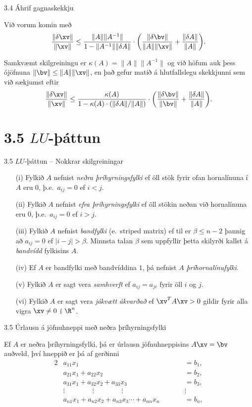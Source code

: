 \begin{frame}{3.4 Áhrif gagnaskekkju} 

Við vorum komin með 
$$
\dfrac{\|\delta\xv\|} {\|\xv\|}\leq 
\dfrac{\|A\|\|A^{-1}\|}{1-\|A^{-1}\|\|\delta A\|}\cdot 
\bigg(\dfrac{\|\delta\bv\|}{\|A\|\|\xv\|}+
\dfrac{\|\delta A\|}{\|A\|}\bigg).
$$

\pause
\smallskip
Samkvæmt skilgreiningu er $\kappa(A)=\|A\|\|A^{-1}\|$ og
við höfum auk þess ójöfnuna $\|\bv\|\leq \|A\|\|\xv\|$, en það gefur 
matið á hlutfallslegu skekkjunni sem við sækjumst eftir
$$
\dfrac{\|\delta\xv\|} {\|\xv\|}\leq 
\dfrac{\kappa(A)}{1-\kappa(A)\cdot(\|\delta A\|/\|A\|)}\cdot 
\bigg(\dfrac{\|\delta\bv\|}{\|\bv\|}+
\dfrac{\|\delta A\|}{\|A\|}\bigg).
$$
\end{frame}

\section*{3.5 $LU$-þáttun}

\begin{frame}{3.5  $LU$-þáttun -- Nokkrar skilgreiningar} 
\begin{enumerate}
  \item[(i)] Fylkið $A$ nefnist {\it neðra  þríhyrningsfylki} ef öll stök fyrir
ofan hornalínuna í $A$ eru $0$, þ.e.~$a_{ij}=0$ ef $i<j$.
\pause
  \item[(ii)] Fylkið $A$ nefnist {\it efra þríhyrningsfylki} ef öll
    stökin neðan við hornalínuna eru $0$, þ.e.~$a_{ij}=0$ ef $i>j$. 
\pause
  \item[(iii)] Fylkið $A$ nefnist {\it bandfylki} (e.~striped matrix) ef til er
$\beta \leq n-2$ þannig að $a_{ij}=0$ ef $|i-j|>\beta$. Minnsta talan
$\beta$ sem uppfyllir þetta skilyrði kallst á {\it bandvídd} fylkisins
$A$.\pause
  \item[(iv)] Ef $A$ er bandfylki með bandvíddina $1$, þá nefnist $A$ {\it
  þríhornalínufylki}.\pause
  \item[(v)] Fylkið $A$ er sagt vera {\it samhverft } ef 
$a_{ij}=a_{ji}$ fyrir öll $i$ og $j$.\pause
  \item[(vi)] Fylkið $A$ er sagt vera {\it jákvætt ákvarðað }  
  ef $\xv^TA\xv>0$ gildir fyrir alla vigra $\xv\neq 0$ í $\R^n$.
\end{enumerate}
\end{frame}


\begin{frame}{3.5  Úrlausn á jöfnuhneppi með neðra þríhyrningsfylki} 

Ef $A$ er neðra þríhyrningsfylki, þá er úrlausn
jöfnuhneppisins $A\xv = \bv$ auðveld, því hneppið er þá af gerðinni 
\begin{alignat*}{2}
	&a_{11}x_1&&=b_1,\\
	&a_{21}x_1+a_{22}x_2&&=b_2,\\
	&a_{31}x_1+a_{32}x_2+a_{33}x_3&&=b_3,\\
	&\vdots \qquad \qquad   \vdots \qquad 
	\qquad \vdots& \qquad& \vdots\\
	&a_{n1}x_1+a_{n2}x_2+a_{n3}x_3\cdots+a_{nn}x_n&&=b_n,
\end{alignat*}
\end{frame}


